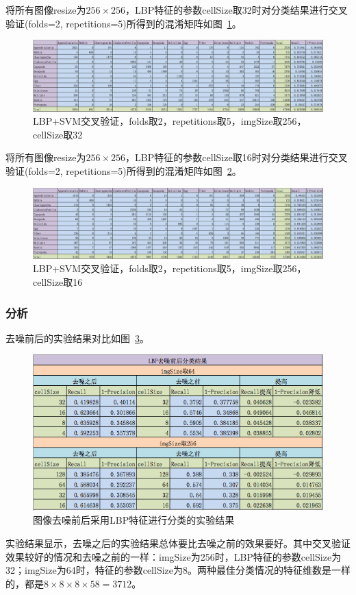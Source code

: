 \documentclass[12pt]{article}
\begin{document}
将所有图像resize为$256 \times 256$，LBP特征的参数cellSize取32时对分类结果进行交叉验证(folds=2, repetitions=5)所得到的混淆矩阵如图~\ref{fig:LBP-SVM-2-folds-5-repetitions-32-256-noNoise}。
\begin{figure}[!ht]
\centering
\includegraphics[width=1.0\linewidth]{LBP-SVM-2-folds-5-repetitions-32-256-noNoise}
\caption{LBP+SVM交叉验证，folds取2，repetitions取5，imgSize取256，cellSize取32}
\label{fig:LBP-SVM-2-folds-5-repetitions-32-256-noNoise}
\end{figure}

将所有图像resize为$256 \times 256$，LBP特征的参数cellSize取16时对分类结果进行交叉验证(folds=2, repetitions=5)所得到的混淆矩阵如图~\ref{fig:LBP-SVM-2-folds-5-repetitions-16-256-noNoise}。
\begin{figure}[!ht]
\centering
\includegraphics[width=1.0\linewidth]{LBP-SVM-2-folds-5-repetitions-16-256-noNoise}
\caption{LBP+SVM交叉验证，folds取2，repetitions取5，imgSize取256，cellSize取16}
\label{fig:LBP-SVM-2-folds-5-repetitions-16-256-noNoise}
\end{figure}

\subsubsection{分析}
去噪前后的实验结果对比如图~\ref{fig:LBP-compare}。
\begin{figure}[!ht]
\centering
\includegraphics[width=0.45\linewidth]{LBP-compare}
\caption{图像去噪前后采用LBP特征进行分类的实验结果}
\label{fig:LBP-compare}
\end{figure}
实验结果显示，去噪之后的实验结果总体要比去噪之前的效果要好。其中交叉验证效果较好的情况和去噪之前的一样：imgSize为256时，LBP特征的参数cellSize为32；imgSize为64时，特征的参数cellSize为8。两种最佳分类情况的特征维数是一样的，都是$8 \times 8 \times 8 \times 58 = 3712$。
\end{document}
